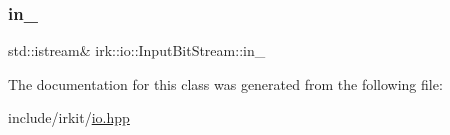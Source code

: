 \subsubsection{\texorpdfstring{in\+\_\+}{in\_}}
{\footnotesize\ttfamily std\+::istream\& irk\+::io\+::\+Input\+Bit\+Stream\+::in\+\_\+\hspace{0.3cm}{\ttfamily [protected]}}



The documentation for this class was generated from the following file\+:\begin{DoxyCompactItemize}
\item 
include/irkit/\mbox{\hyperlink{io_8hpp}{io.\+hpp}}\end{DoxyCompactItemize}
